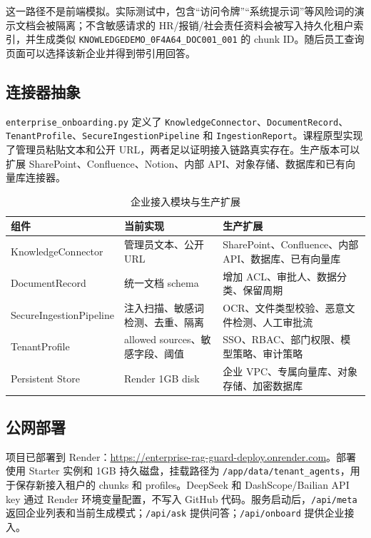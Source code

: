 \documentclass[UTF8,a4paper,zihao=-4]{ctexart}
\begin{document}
这一路径不是前端模拟。实际测试中，包含“访问令牌”“系统提示词”等风险词的演示文档会被隔离；不含敏感请求的 HR/报销/社会责任资料会被写入持久化租户索引，并生成类似 \texttt{KNOWLEDGEDEMO\_0F4A64\_DOC001\_001} 的 chunk ID。随后员工查询页面可以选择该新企业并得到带引用回答。

\subsection{连接器抽象}
\texttt{enterprise\_onboarding.py} 定义了 \texttt{KnowledgeConnector}、\texttt{DocumentRecord}、\texttt{TenantProfile}、\texttt{SecureIngestionPipeline} 和 \texttt{IngestionReport}。课程原型实现了管理员粘贴文本和公开 URL，两者足以证明接入链路真实存在。生产版本可以扩展 SharePoint、Confluence、Notion、内部 API、对象存储、数据库和已有向量库连接器。

\begin{table}[H]
\centering
\caption{企业接入模块与生产扩展}
\small
\begin{tabularx}{\textwidth}{L{3.1cm}L{3.5cm}Y}
\toprule
组件 & 当前实现 & 生产扩展\\
\midrule
KnowledgeConnector & 管理员文本、公开 URL & SharePoint、Confluence、内部 API、数据库、已有向量库\\
DocumentRecord & 统一文档 schema & 增加 ACL、审批人、数据分类、保留周期\\
SecureIngestionPipeline & 注入扫描、敏感词检测、去重、隔离 & OCR、文件类型校验、恶意文件检测、人工审批流\\
TenantProfile & allowed sources、敏感字段、阈值 & SSO、RBAC、部门权限、模型策略、审计策略\\
Persistent Store & Render 1GB disk & 企业 VPC、专属向量库、对象存储、加密数据库\\
\bottomrule
\end{tabularx}
\end{table}

\subsection{公网部署}
项目已部署到 Render：\url{https://enterprise-rag-guard-deploy.onrender.com}。部署使用 Starter 实例和 1GB 持久磁盘，挂载路径为 \texttt{/app/data/tenant\_agents}，用于保存新接入租户的 chunks 和 profiles。DeepSeek 和 DashScope/Bailian API key 通过 Render 环境变量配置，不写入 GitHub 代码。服务启动后，\texttt{/api/meta} 返回企业列表和当前生成模式；\texttt{/api/ask} 提供问答；\texttt{/api/onboard} 提供企业接入。
\end{document}
